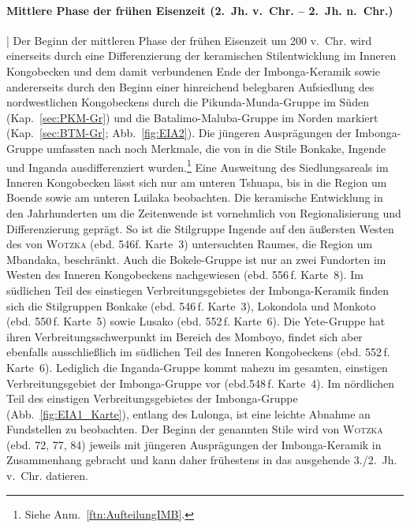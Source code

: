 \paragraph{Mittlere Phase der frühen Eisenzeit (2.~Jh. v.~Chr. -- 2.~Jh. n.~Chr.)}\hspace{-.5em}|\hspace{.5em}%
Der Beginn der mittleren Phase der frühen Eisenzeit um 200 v.~Chr. wird einerseits durch eine Differenzierung der keramischen Stilentwicklung im Inneren Kongobecken und dem damit verbundenen Ende der Imbonga-Keramik sowie andererseits durch den Beginn einer hinreichend belegbaren Aufsiedlung des nordwestlichen Kongobeckens durch die Pikunda-Munda-Gruppe im Süden (Kap.~\ref{sec:PKM-Gr}) und die Batalimo-Maluba-Gruppe im Norden markiert (Kap.~\ref{sec:BTM-Gr}; Abb.~\ref{fig:EIA2}). Die jüngeren Ausprägungen der Imbonga-Gruppe umfassten nach \textcite{Eggert.1983} noch Merkmale, die von \textcite{Wotzka.1995} in die Stile Bonkake, Ingende und Inganda ausdifferenziert wurden.\footnote{Siehe Anm.~\ref{ftn:AufteilungIMB}.} Eine Ausweitung des Siedlungsareals im Inneren Kongobecken lässt sich nur am unteren Tshuapa, bis in die Region um Boende sowie am unteren Luilaka beobachten. Die keramische Entwicklung in den Jahrhunderten um die Zeitenwende ist vornehmlich von Regionalisierung und Differenzierung geprägt. So ist die Stilgruppe Ingende auf den äußersten Westen des von \textsc{Wotzka} (ebd. 546f. Karte~3) untersuchten Raumes, die Region um Mbandaka, beschränkt. Auch die Bokele-Gruppe ist nur an zwei Fundorten im Westen des Inneren Kongobeckens nachgewiesen (ebd. 556\,f. Karte~8). Im südlichen Teil des einstiegen Verbreitungsgebietes der Imbonga-Keramik finden sich die Stilgruppen Bonkake (ebd. 546\,f. Karte~3), Lokondola und Monkoto (ebd. 550\,f. Karte~5) sowie Lusako (ebd. 552\,f. Karte~6). Die Yete-Gruppe hat ihren Verbreitungsschwerpunkt im Bereich des Momboyo, findet sich aber ebenfalls ausschließlich im südlichen Teil des Inneren Kongobeckens (ebd. 552\,f. Karte~6). Lediglich die Inganda-Gruppe kommt nahezu im gesamten, einstigen Verbreitungsgebiet der Imbonga-Gruppe vor (ebd.548\,f. Karte~4). Im nördlichen Teil des einstigen Verbreitungsgebietes der Imbonga-Gruppe (Abb.~\ref{fig:EIA1_Karte}), entlang des Lulonga, ist eine leichte Abnahme an Fundstellen zu beobachten. Der Beginn der genannten Stile wird von \textsc{Wotzka} (ebd. 72, 77, 84) jeweils mit jüngeren Ausprägungen der Imbonga-Keramik in Zusammenhang gebracht und kann daher frühestens in das ausgehende 3./2.~Jh. v.~Chr. datieren.

